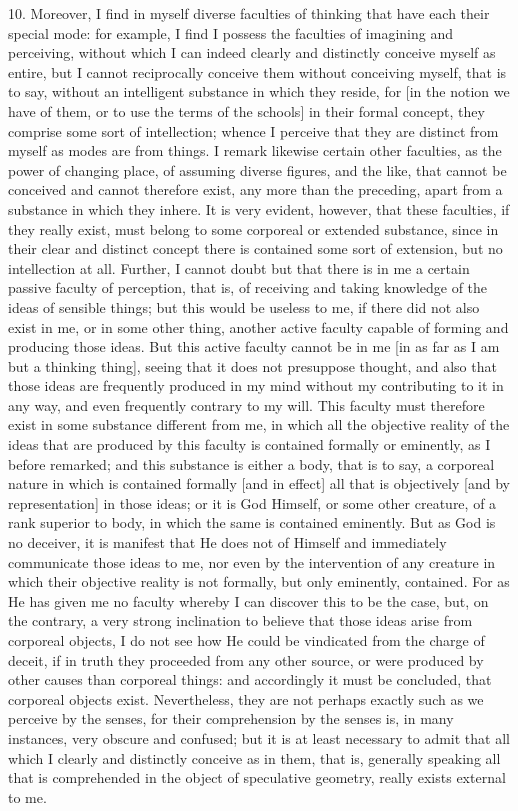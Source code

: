 10. Moreover, I find in myself diverse faculties of thinking that have each their special mode: for example, I find I possess the faculties of imagining and perceiving, without which I can indeed clearly and distinctly conceive myself as entire, but I cannot reciprocally conceive them without conceiving myself, that is to say, without an intelligent substance in which they reside, for [in the notion we have of them, or to use the terms of the schools] in their formal concept, they comprise some sort of intellection; whence I perceive that they are distinct from myself as modes are from things. I remark likewise certain other faculties, as the power of changing place, of assuming diverse figures, and the like, that cannot be conceived and cannot therefore exist, any more than the preceding, apart from a substance in which they inhere. It is very evident, however, that these faculties, if they really exist, must belong to some corporeal or extended substance, since in their clear and distinct concept there is contained some sort of extension, but no intellection at all. Further, I cannot doubt but that there is in me a certain passive faculty of perception, that is, of receiving and taking knowledge of the ideas of sensible things; but this would be useless to me, if there did not also exist in me, or in some other thing, another active faculty capable of forming and producing those ideas. But this active faculty cannot be in me [in as far as I am but a thinking thing], seeing that it does not presuppose thought, and also that those ideas are frequently produced in my mind without my contributing to it in any way, and even frequently contrary to my will. This faculty must therefore exist in some substance different from me, in which all the objective reality of the ideas that are produced by this faculty is contained formally or eminently, as I before remarked; and this substance is either a body, that is to say, a corporeal nature in which is contained formally [and in effect] all that is objectively [and by representation] in those ideas; or it is God Himself, or some other creature, of a rank superior to body, in which the same is contained eminently. But as God is no deceiver, it is manifest that He does not of Himself and immediately communicate those ideas to me, nor even by the intervention of any creature in which their objective reality is not formally, but only eminently, contained. For as He has given me no faculty whereby I can discover this to be the case, but, on the contrary, a very strong inclination to believe that those ideas arise from corporeal objects, I do not see how He could be vindicated from the charge of deceit, if in truth they proceeded from any other source, or were produced by other causes than corporeal things: and accordingly it must be concluded, that corporeal objects exist. Nevertheless, they are not perhaps exactly such as we perceive by the senses, for their comprehension by the senses is, in many instances, very obscure and confused; but it is at least necessary to admit that all which I clearly and distinctly conceive as in them, that is, generally speaking all that is comprehended in the object of speculative geometry, really exists external to me.

